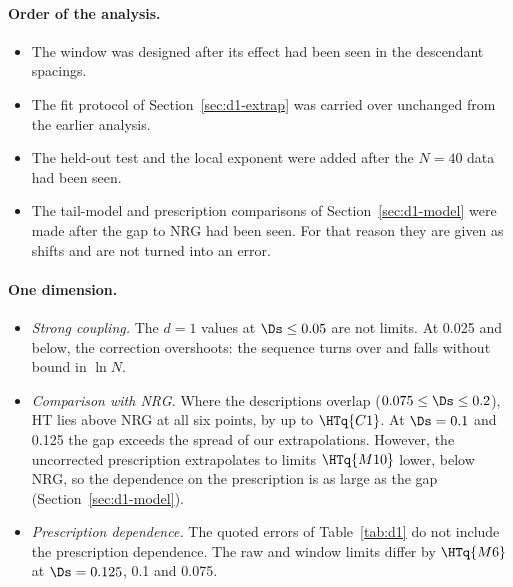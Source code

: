 \paragraph{Order of the analysis.}
\begin{itemize}
\item The window was designed after its effect had been seen in the descendant spacings.
\item The fit protocol of Section~\ref{sec:d1-extrap} was carried over unchanged from the earlier 
 analysis.
\item The held-out test and the local exponent were added after the $N=40$ data had been seen.
\item The tail-model and prescription comparisons of Section~\ref{sec:d1-model} were made after the gap to NRG had
 been seen. For that reason they are given as shifts and are not turned into an error.
\end{itemize}

\paragraph{One dimension.}
\begin{itemize}
\item \emph{Strong coupling.} The $d=1$ values at $\Ds\le0.05$ are not limits. At 0.025 and below, the correction
 overshoots: the sequence turns over and falls without bound in $\ln N$.
\item \emph{Comparison with NRG.} Where the descriptions overlap ($0.075\le\Ds\le0.2$), HT lies above NRG at all six points, by up to
 $\HTq{C1}$. At $\Ds=0.1$ and 0.125 the gap exceeds the spread of our extrapolations. However, the uncorrected
 prescription extrapolates to limits $\HTq{M10}$ lower, below NRG, so the dependence on the prescription is as large
 as the gap (Section~\ref{sec:d1-model}).
\item \emph{Prescription dependence.} The quoted errors of Table~\ref{tab:d1} do not include the prescription
 dependence. The raw and window limits differ by $\HTq{M6}$ at $\Ds=0.125$, 0.1 and 0.075.
\end{itemize}




